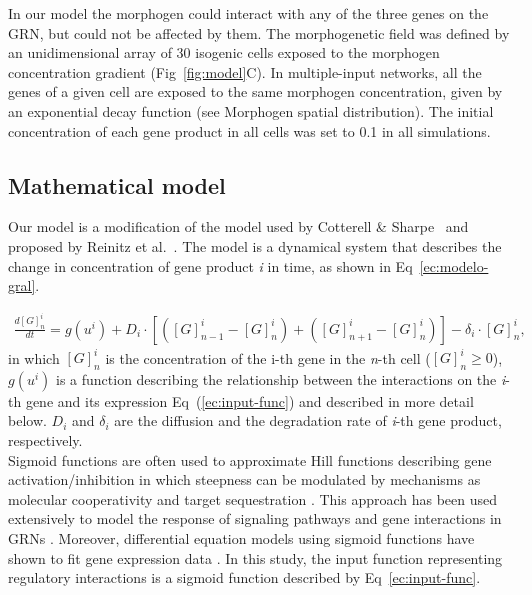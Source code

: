 \documentclass[10pt,letterpaper]{article}
\begin{document}
In our model the morphogen could interact with any of the three genes on the
GRN, but could not be affected by them. The morphogenetic field was defined
by an unidimensional array of 30 isogenic cells exposed to the morphogen
concentration gradient (Fig~\ref{fig:model}C). In multiple-input networks,
all the genes of a given cell are exposed to the same morphogen
concentration, given by an exponential decay function (see Morphogen
spatial distribution). The initial concentration of each gene product in
all cells was set to 0.1 in all simulations.\\

\subsection*{Mathematical model}

Our model is a modification of the model used by Cotterell \& Sharpe~\cite{Cotterell2010}
and proposed by Reinitz et al.~\cite{Reinitz1995}. The
model is a dynamical system that describes the change in concentration of gene
product \emph{i} in time, as shown in Eq~\ref{ec:modelo-gral}.

 \begin{eqnarray}
  \frac{d[G]^i_n}{dt}
  = g(u^i) + D_i \cdot [ ([G]^i_{n-1}-[G]^i_n) +([G]^i_{n+1}-[G]^i_n)]-\delta_i
  \cdot [ G ]^i_n ,
  \label{ec:modelo-gral}
 \end{eqnarray}
\noindent
in which $[G]^{i}_{n}$ is the concentration of the i-th gene in the \emph{n}-th
cell ($[G]^{i}_{n} ≥ 0$), $g(u^i)$ is a function describing the relationship
between the interactions on the \emph{i}-th gene and its expression
Eq~(\ref{ec:input-func}) and described in more detail below. $D_i$ and
$\delta_i$ are the diffusion and the degradation rate of \emph{i}-th gene
product, respectively.\\

Sigmoid functions are often used to approximate Hill functions describing gene
activation/inhibition in which steepness can be modulated by mechanisms as
molecular cooperativity and target sequestration \cite{ricci2011}. This approach
has been used extensively to model the response of signaling pathways and gene
interactions in GRNs \cite{mendoza2006, vu2007, zhang2013, armao2016}.
Moreover, differential equation models using sigmoid functions have shown to
fit gene expression data \cite{chen2005, dahlquist2015}. In this study, the
input function representing regulatory interactions is a sigmoid function
described by Eq~\ref{ec:input-func}.
\end{document}
